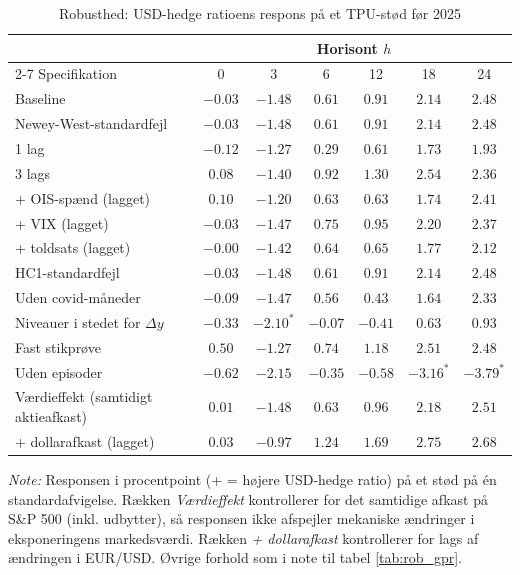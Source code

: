 \begin{table}[H]
\centering
\caption{Robusthed: USD-hedge ratioens respons på et TPU-stød før 2025}
\label{tab:rob_hr_tpu_foer}
\begin{threeparttable}
\begin{tabular}{lcccccc}
\toprule
 & \multicolumn{6}{c}{Horisont $h$} \\
\cmidrule(lr){2-7}
Specifikation & 0 & 3 & 6 & 12 & 18 & 24 \\
\midrule
Baseline & $-0.03$ & $-1.48$ & $0.61$ & $0.91$ & $2.14$ & $2.48$ \\
Newey-West-standardfejl & $-0.03$ & $-1.48$ & $0.61$ & $0.91$ & $2.14$ & $2.48$ \\
1 lag & $-0.12$ & $-1.27$ & $0.29$ & $0.61$ & $1.73$ & $1.93$ \\
3 lags & $0.08$ & $-1.40$ & $0.92$ & $1.30$ & $2.54$ & $2.36$ \\
+ OIS-spænd (lagget) & $0.10$ & $-1.20$ & $0.63$ & $0.63$ & $1.74$ & $2.41$ \\
+ VIX (lagget) & $-0.03$ & $-1.47$ & $0.75$ & $0.95$ & $2.20$ & $2.37$ \\
+ toldsats (lagget) & $-0.00$ & $-1.42$ & $0.64$ & $0.65$ & $1.77$ & $2.12$ \\
HC1-standardfejl & $-0.03$ & $-1.48$ & $0.61$ & $0.91$ & $2.14$ & $2.48$ \\
Uden covid-måneder & $-0.09$ & $-1.47$ & $0.56$ & $0.43$ & $1.64$ & $2.33$ \\
Niveauer i stedet for $\Delta y$ & $-0.33$ & $-2.10^{*}$ & $-0.07$ & $-0.41$ & $0.63$ & $0.93$ \\
Fast stikprøve & $0.50$ & $-1.27$ & $0.74$ & $1.18$ & $2.51$ & $2.48$ \\
Uden episoder & $-0.62$ & $-2.15$ & $-0.35$ & $-0.58$ & $-3.16^{*}$ & $-3.79^{*}$ \\
Værdieffekt (samtidigt aktieafkast) & $0.01$ & $-1.48$ & $0.63$ & $0.96$ & $2.18$ & $2.51$ \\
+ dollarafkast (lagget) & $0.03$ & $-0.97$ & $1.24$ & $1.69$ & $2.75$ & $2.68$ \\
\bottomrule
\end{tabular}
\begin{tablenotes}[flushleft]\footnotesize
\item \textit{Note:} Responsen i procentpoint (+ = højere USD-hedge ratio) på et stød på én standardafvigelse. Rækken \textit{Værdieffekt} kontrollerer for det samtidige afkast på S\&P 500 (inkl. udbytter), så responsen ikke afspejler mekaniske ændringer i eksponeringens markedsværdi. Rækken \textit{+ dollarafkast} kontrollerer for lags af ændringen i EUR/USD. Øvrige forhold som i note til tabel \ref{tab:rob_gpr}.
\end{tablenotes}
\end{threeparttable}
\end{table}